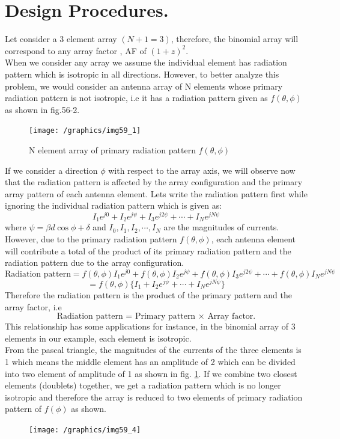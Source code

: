 \section{Design Procedures.}
Let consider a 3 element array $(N + 1 = 3)$, therefore, the binomial array will correspond to any array factor , AF of $(1 + z)^2$.\\
When we consider any array we assume the individual element has radiation pattern which is isotropic in all directions. However, to better analyze this problem, we would consider an antenna array of N elements whose primary radiation pattern is not isotropic, i.e it has a radiation pattern given as $f(\theta,\phi)$ as shown in fig.56-2.

\begin{figure}[h]
\centering
\texttt{[image: /graphics/img59\_1]}
\caption{N element array of primary radiation pattern $f(\theta, \phi)$}
\label{fig:fig-2}
\end{figure}
If we consider a direction $\phi$ with respect to the array axis, we will observe now that the radiation pattern is affected by the array configuration and the primary array pattern of each antenna element. Lets write the radiation pattern first while ignoring the individual radiation pattern which is given as: 
$$I_1 e^{j0} + I_2 e^{j\psi} + I_3 e^{j2\psi} + \cdots + I_N e^{jN\psi}$$
where $\psi = \beta d\cos\phi + \delta$ and $I_0, I_1, I_2, \cdots, I_N$ are the magnitudes of currents. However, due to the primary radiation pattern $f(\theta, \phi)$, each antenna element will contribute a total of the product of its primary radiation pattern and the radiation pattern due to the array configuration.
\begin{dmath*}
\text{Radiation pattern} = f(\theta, \phi)I_1 e^{j0} + f(\theta, \phi)I_2 e^{j\psi} + f(\theta, \phi)I_3 e^{j2\psi} + \cdots + f(\theta, \phi)I_N e^{jN\psi} 
\end{dmath*}
$$= f(\theta, \phi)\{I_1 + I_2 e^{j\psi}  + \cdots + I_N e^{jN\psi}\}$$
Therefore the radiation pattern is the product of the primary pattern and the array factor, i.e
\begin{equation}
\text{Radiation pattern = Primary pattern $\times$ Array factor.}
\label{eqn53}
\end{equation}
This relationship has some applications for instance, in the binomial array of 3 elements in our example, each element is isotropic.\\
From the pascal triangle, the magnitudes of the currents of the three elements is 1   which means the middle element has an amplitude of 2 which can be divided into two element of amplitude of 1 as shown in fig. \ref{fig:fig-2}. If we combine two closest elements (doublets) together, we get a radiation pattern which is no longer isotropic and therefore the array is reduced to two elements of primary radiation pattern of $f(\phi)$ as shown.
\begin{figure}[h]
\centering
\texttt{[image: /graphics/img59\_4]}
\caption{}
\label{fig:fig-3}
\end{figure}

